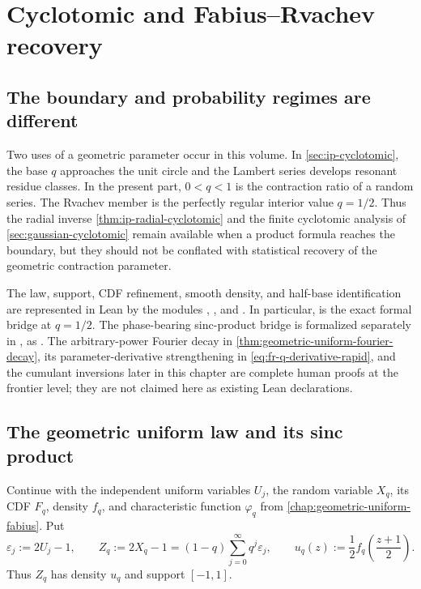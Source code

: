 \chapter{Cyclotomic and Fabius--Rvachev recovery}
\label{chap:cyclotomic-fabius-recovery}

\section{The boundary and probability regimes are different}
\label{sec:cyclotomic-fabius-interface}

Two uses of a geometric parameter occur in this volume.  In
\cref{sec:ip-cyclotomic}, the base \(q\) approaches the unit circle and the
Lambert series develops resonant residue classes.  In the present part,
\(0<q<1\) is the contraction ratio of a random series.  The Rvachev member is
the perfectly regular interior value \(q=1/2\).  Thus the radial inverse
\cref{thm:ip-radial-cyclotomic} and the finite cyclotomic analysis of
\cref{sec:gaussian-cyclotomic} remain available when a product formula reaches
the boundary, but they should not be conflated with statistical recovery of
the geometric contraction parameter.

The law, support, CDF refinement, smooth density, and half-base
identification are represented in Lean by the modules
,
, and
.  In particular,
 is the exact formal bridge
at \(q=1/2\).  The phase-bearing sinc-product bridge is formalized separately
in , as
.
The arbitrary-power Fourier decay in
\cref{thm:geometric-uniform-fourier-decay}, its
parameter-derivative strengthening in \cref{eq:fr-q-derivative-rapid}, and the
cumulant inversions later in this chapter are complete human proofs at the
frontier level; they are not claimed here as existing Lean declarations.

\section{The geometric uniform law and its sinc product}
\label{sec:fr-geometric-law}

Continue with the independent uniform variables \(U_j\), the random variable
\(X_q\), its CDF \(F_q\), density \(f_q\), and characteristic function
\(\varphi_q\) from \cref{chap:geometric-uniform-fabius}.  Put
\begin{equation}\label{eq:fr-Z}
 \varepsilon_j:=2U_j-1,
 \qquad
 Z_q:=2X_q-1=(1-q)\sum_{j=0}^{\infty}q^j\varepsilon_j,
 \qquad
 u_q(z):=\frac12 f_q\!\left(\frac{z+1}{2}\right).
\end{equation}
Thus \(Z_q\) has density \(u_q\) and support \([-1,1]\).

